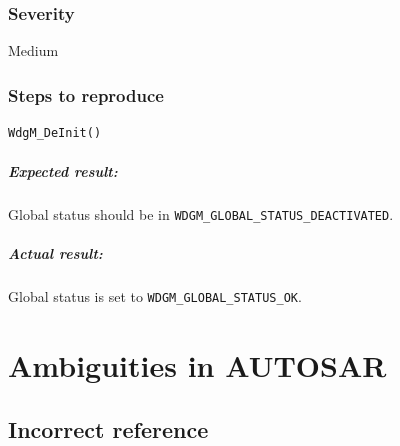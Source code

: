 \subsection{Severity}
Medium

\subsection{Steps to reproduce}
\begin{lstlisting}
WdgM_DeInit()
\end{lstlisting}
\paragraph{Expected result:}
Global status should be in \lstinline!WDGM_GLOBAL_STATUS_DEACTIVATED!.
\paragraph{Actual result:}
Global status is set to \lstinline!WDGM_GLOBAL_STATUS_OK!.



\chapter{Ambiguities in AUTOSAR}





\section{Incorrect reference}

